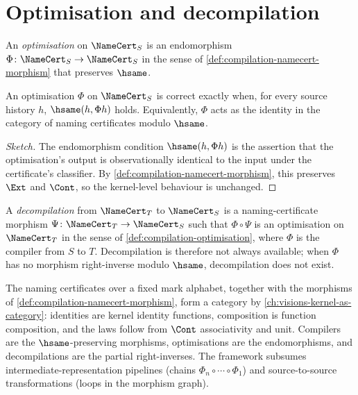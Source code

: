 \section{Optimisation and decompilation}
\label{sec:compilation-optimisation-decompilation}

\begin{definition}[Optimisation]
\label{def:compilation-optimisation}
An \emph{optimisation} on $\NameCert_S$ is an endomorphism $\Phi \colon \NameCert_S \to \NameCert_S$ in the sense of \autoref{def:compilation-namecert-morphism} that preserves $\hsame$.
\end{definition}

\begin{theorem}
\label{thm:compilation-optimisation-correct}
An optimisation $\Phi$ on $\NameCert_S$ is correct exactly when, for every source history $h$, $\hsame(h, \Phi h)$ holds. Equivalently, $\Phi$ acts as the identity in the category of naming certificates modulo $\hsame$.
\end{theorem}

\begin{proof}[Sketch]
The endomorphism condition $\hsame(h, \Phi h)$ is the assertion that the optimisation's output is observationally identical to the input under the certificate's classifier. By \autoref{def:compilation-namecert-morphism}, this preserves $\Ext$ and $\Cont$, so the kernel-level behaviour is unchanged.
\end{proof}

\begin{definition}[Decompilation]
\label{def:compilation-decompilation}
A \emph{decompilation} from $\NameCert_T$ to $\NameCert_S$ is a naming-certificate morphism $\Psi \colon \NameCert_T \to \NameCert_S$ such that $\Phi \circ \Psi$ is an optimisation on $\NameCert_T$ in the sense of \autoref{def:compilation-optimisation}, where $\Phi$ is the compiler from $S$ to $T$. Decompilation is therefore not always available; when $\Phi$ has no morphism right-inverse modulo $\hsame$, decompilation does not exist.
\end{definition}

\begin{remark}
\label{rem:compilation-category}
The naming certificates over a fixed mark alphabet, together with the morphisms of \autoref{def:compilation-namecert-morphism}, form a category by \autoref{ch:visions-kernel-as-category}: identities are kernel identity functions, composition is function composition, and the laws follow from $\Cont$ associativity and unit. Compilers are the $\hsame$-preserving morphisms, optimisations are the endomorphisms, and decompilations are the partial right-inverses. The framework subsumes intermediate-representation pipelines (chains $\Phi_n \circ \cdots \circ \Phi_1$) and source-to-source transformations (loops in the morphism graph).
\end{remark}


